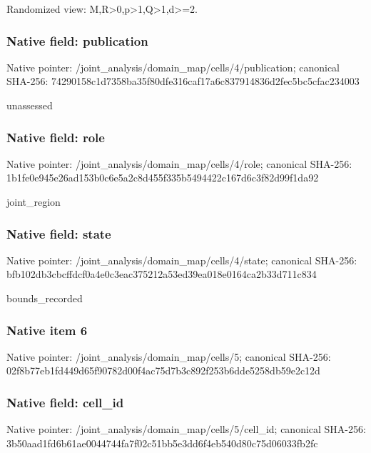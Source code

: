 \documentclass[10pt,a4paper]{article}
\begin{document}
\begingroup\raggedright\sloppy Randomized view:\allowbreak{} M,\allowbreak{}R>0,\allowbreak{}p>1,\allowbreak{}Q>1,\allowbreak{}d>=\allowbreak{}2.\par\endgroup

\subsubsection{Native field: publication}
Native pointer: /joint\_\allowbreak{}analysis/domain\_\allowbreak{}map/cells/4/publication; canonical SHA-256: 74290158c1d7358ba35f80dfe316caf17a6c837914836d2fec5bc5cfac234003

\begingroup\raggedright\sloppy unassessed\par\endgroup

\subsubsection{Native field: role}
Native pointer: /joint\_\allowbreak{}analysis/domain\_\allowbreak{}map/cells/4/role; canonical SHA-256: 1b1fe0e945e26ad153b0c6e5a2c8d455f335b5494422c167d6c3f82d99f1da92

\begingroup\raggedright\sloppy joint\_\allowbreak{}region\par\endgroup

\subsubsection{Native field: state}
Native pointer: /joint\_\allowbreak{}analysis/domain\_\allowbreak{}map/cells/4/state; canonical SHA-256: bfb102db3cbcffdcf0a4e0c3eac375212a53ed39ea018e0164ca2b33d711c834

\begingroup\raggedright\sloppy bounds\_\allowbreak{}recorded\par\endgroup

\subsubsection{Native item 6}
Native pointer: /joint\_\allowbreak{}analysis/domain\_\allowbreak{}map/cells/5; canonical SHA-256: 02f8b77eb1fd449d65f90782d00f4ac75d7b3c892f253b6dde5258db59e2c12d

\subsubsection{Native field: cell\_\allowbreak{}id}
Native pointer: /joint\_\allowbreak{}analysis/domain\_\allowbreak{}map/cells/5/cell\_\allowbreak{}id; canonical SHA-256: 3b50aad1fd6b61ae0044744fa7f02c51bb5e3dd6f4eb540d80c75d06033fb2fc
\end{document}
